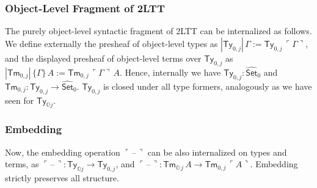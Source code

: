 \documentclass[acmsmall,screen]{acmart}
\newcommand{\msf}[1]{\mathsf{#1}}
\newcommand{\mbb}[1]{\mathbb{#1}}
\newcommand{\wh}[1]{\widehat{#1}}
\newcommand{\mbbo}{\mbb{O}}
\newcommand{\Con}{\msf{Con}}
\newcommand{\Sub}{\msf{Sub}}
\newcommand{\Ty}{\msf{Ty}}
\newcommand{\Tm}{\msf{Tm}}
\newcommand{\Set}{\mathsf{Set}}
\newcommand{\blank}{{\mathord{\hspace{1pt}\text{--}\hspace{1pt}}}}
\newcommand{\emb}[1]{\ulcorner#1\urcorner}
\newcommand{\ev}{\mbb{E}}
\theoremstyle{remark}
\newcommand{\whset}{\wh{\Set}}
\begin{document}
\subsubsection{Object-Level Fragment of 2LTT}
The purely object-level syntactic fragment of 2LTT can be internalized as
follows. We define externally the presheaf of object-level types as
$|\Ty_{0,j}|\,\Gamma := \Ty_{0,j}\,\emb{\Gamma}$, and the displayed presheaf of
object-level terms over $\Ty_{0,j}$ as $|\Tm_{0,j}|\,\{\Gamma\}\,A :=
\Tm_{0,j}\,\emb{\Gamma}\,A$. Hence, internally we have $\Ty_{0,j} : \whset_0$ and
$\Tm_{0,j} : \Ty_{0,j} \to \whset_0$. $\Ty_{0,j}$ is closed under all type formers,
analogously as we have seen for $\Ty_{\mbbo j}$.



\subsubsection{Embedding}
Now, the embedding operation $\emb{\blank}$ can be also internalized on types
and terms, as $\emb{\blank} : \Ty_{\mbbo j} \to \Ty_{0,j}$, and $\emb{\blank}
:\Tm_{\mbbo\,j}\,A \to \Tm_{0,j}\,\emb{A}$. Embedding strictly preserves all structure.
\end{document}
